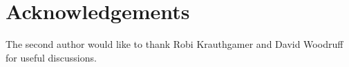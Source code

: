 \documentclass{acmsmall}
\newtheorem{prop}[theorem]{Proposition}
\newcommand{\cR}{{\cal R}}
\newcommand{\cT}{{\cal T}}
\newcommand{\cU}{{\cal U}}
\newcommand{\eps}{\varepsilon}
\newcommand{\approxlis}{{\rm {\bf ApproxLIS}}}
\newcommand{\findsplitter}{{\rm {\bf FindSplitter}}}
\begin{document}
%
%
%
%
%

\section{Acknowledgements} The second author would like to thank Robi Krauthgamer and David Woodruff
for useful discussions.



\end{document}

